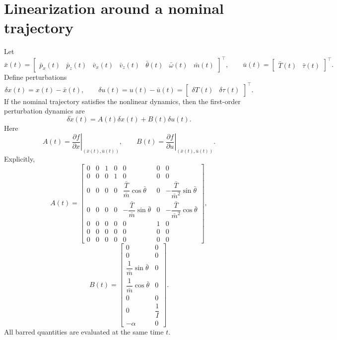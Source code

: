 \documentclass[10pt]{article}
\newcommand{\dd}{\delta}
\newcommand{\thb}{\bar\theta}
\newcommand{\mb}{\bar m}
\newcommand{\Tb}{\bar T}
\newcommand{\ub}{\bar u}
\newcommand{\xb}{\bar x}
\newcommand{\eps}{\omega}
\newcommand{\vphi}{\alpha}
\begin{document}
\section{Linearization around a nominal trajectory}
Let
\[
    \xb(t)=
    \begin{bmatrix}
    \bar p_x(t) & \bar p_z(t) & \bar v_x(t) & \bar v_z(t) & \thb(t) & \bar\eps(t) & \mb(t)
    \end{bmatrix}^{\top},
    \qquad
    \ub(t)=
    \begin{bmatrix}\Tb(t) & \bar\tau(t)\end{bmatrix}^{\top}.
\]
Define perturbations
\[
    \dd x(t)=x(t)-\xb(t),
    \qquad
    \dd u(t)=u(t)-\ub(t)=
    \begin{bmatrix}\dd T(t) & \dd\tau(t)\end{bmatrix}^{\top}.
\]
If the nominal trajectory satisfies the nonlinear dynamics, then the first-order perturbation dynamics are
\[
    \boxed{\dd\dot x(t)=A(t)\dd x(t)+B(t)\dd u(t)}.
\]
Here
\[
    A(t)=\left.\frac{\partial f}{\partial x}\right|_{(\xb(t),\ub(t))},
    \qquad
    B(t)=\left.\frac{\partial f}{\partial u}\right|_{(\xb(t),\ub(t))}.
\]
Explicitly,
{\small
\[
A(t)=
\begin{bmatrix}
0&0&1&0&0&0&0\\
0&0&0&1&0&0&0\\
0&0&0&0&\dfrac{\Tb}{\mb}\cos\thb&0&-\dfrac{\Tb}{\mb^2}\sin\thb\\
0&0&0&0&-\dfrac{\Tb}{\mb}\sin\thb&0&-\dfrac{\Tb}{\mb^2}\cos\thb\\
0&0&0&0&0&1&0\\
0&0&0&0&0&0&0\\
0&0&0&0&0&0&0
\end{bmatrix},
\]
\[
B(t)=
\begin{bmatrix}
0&0\\
0&0\\
\dfrac{1}{\mb}\sin\thb&0\\
\dfrac{1}{\mb}\cos\thb&0\\
0&0\\
0&\dfrac{1}{I}\\
-\vphi&0
\end{bmatrix}.
\]
}
All barred quantities are evaluated at the same time $t$.
\end{document}
